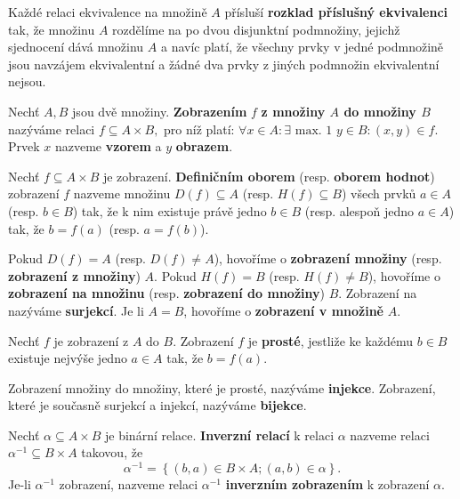 \begin{pozn}
  Každé relaci ekvivalence na množině $A$ přísluší \textbf{rozklad příslušný ekvivalenci} tak, že množinu $A$ rozdělíme na po dvou disjunktní podmnožiny, jejichž sjednocení dává množinu $A$ a navíc platí, že všechny prvky v jedné podmnožině jsou navzájem ekvivalentní a žádné dva prvky z jiných podmnožin ekvivalentní nejsou.
\end{pozn}

\begin{definition}
  Nechť $A,B$ jsou dvě množiny. \textbf{Zobrazením} $f$ \textbf{z množiny $A$ do množiny $B$} nazýváme relaci $f\subseteq A \times B,$ pro níž platí: $\forall x \in A: \exists \text{ max. 1 } y \in B: (x,y) \in f$. Prvek $x$ nazveme \textbf{vzorem} a $y$ \textbf{obrazem}.
\end{definition}

\begin{definition}
  Nechť $f\subseteq A\times B$ je zobrazení. \textbf{Definičním oborem} (resp. \textbf{oborem hodnot}) zobrazení $f$ nazveme množinu $D(f)\subseteq A$ (resp. $H(f)\subseteq B$) všech prvků $a\in A$ (resp. $b\in B$) tak, že k nim existuje právě jedno $b\in B$ (resp. alespoň jedno $a\in A$) tak, že $b=f(a)$ (resp. $a=f(b)$).
\end{definition}

\begin{definition}
  Pokud $D(f) = A$ (resp. $D(f)\ne A$), hovoříme o \textbf{zobrazení množiny} (resp. \textbf{zobrazení z množiny}) $A$. Pokud $H(f)=B$ (resp. $H(f)\ne B$), hovoříme o \textbf{zobrazení na množinu} (resp. \textbf{zobrazení do množiny}) $B$.
  Zobrazení na nazýváme \textbf{surjekcí}. Je li $A=B$, hovoříme o \textbf{zobrazení v množině} $A$.
\end{definition}

\begin{definition}
  Nechť $f$ je zobrazení z $A$ do $B$. Zobrazení $f$ je \textbf{prosté}, jestliže ke každému $b\in B$ existuje nejvýše jedno $a \in A$ tak, že $b=f(a).$
\end{definition}

\begin{definition}
  Zobrazení množiny do množiny, které je prosté, nazýváme \textbf{injekce}. Zobrazení, které je současně surjekcí a injekcí, nazýváme \textbf{bijekce}.
\end{definition}

\begin{definition}
  Nechť $\alpha \subseteq A\times B$ je binární relace. \textbf{Inverzní relací} k relaci $\alpha$ nazveme relaci $\alpha^{-1} \subseteq B\times A$ takovou, že
  \[
    \alpha^{-1}=\left\{ (b,a)\in B\times A;  (a,b)\in \alpha\right\}.
  \]
  Je-li $\alpha^{-1}$ zobrazení, nazveme relaci $\alpha ^{-1}$ \textbf{inverzním zobrazením} k zobrazení $\alpha$.
\end{definition}

